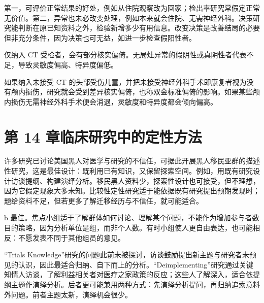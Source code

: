 \begin{answerlist}
\item[2c.] 第一，可评价正常结果的好处，例如从住院观察改为回家；检出率研究常假定正常无价值。第二，异常也未必改变处理，例如本来就会住院、无需神经外科。决策研究能判断在原已知资料之外，检验新增多少有用信息。改变决策是改善结局的必要但非充分条件，因为决策也可无益，如进一步检查假阳性者。
\item[3a.] 仅纳入 CT 受检者，会有部分核实偏倚。无局灶异常的假阴性或真阴性者代表不足，导致灵敏度偏高、特异度偏低。
\item[3b.] 如果纳入未接受 CT 的头部受伤儿童，并把未接受神经外科手术即康复者视为没有颅内损伤，研究就会受到差异核实偏倚，也称双金标准偏倚的影响。如果某些颅内损伤无需神经外科手术便会消退，灵敏度和特异度都会倾向偏高。
\end{answerlist}

\section{第 14 章\quad 临床研究中的定性方法}
\begin{answerlist}
\item[1.] 许多研究已讨论美国黑人对医学与研究的不信任，可据此开展黑人移民亚群的描述性研究，这是最佳设计：既利用已有知识，又保留探索空间。例如，用既有研究设计访谈提纲、构建演绎分析。移民黑人资料少，探索性设计也可接受，但不理想，因为它假定现象大多未知。比较性定性研究适于能依据既有研究提出预期发现时；题给资料不足，但若更多了解迁移经历与不信任，就可能适合。
\item[2.] b 最佳。焦点小组适于了解群体如何讨论、理解某个问题，不能作为增加参与者数目的策略，因为分析单位是组，而非个人数。有时小组使人更自由表达，也可能相反：不愿发表不同于其他组员的意见。
\item[3.] “Trials Knowledge”研究的问题此前未被探讨，访谈鼓励提出新主题与研究者未预见的认识，因此最适合归纳、自下而上的分析。“Deimplementing”研究通过关键知情人访谈，了解利益相关者对医疗之家政策的反应；这些人了解深入，适合依提纲主题作演绎分析。后者更可能兼用两种方式：先演绎分析提问，再归纳追索意料外问题。前者主题太新，演绎机会很少。
\end{answerlist}

